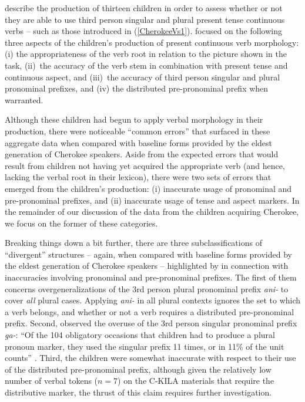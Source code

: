 \documentclass[output=paper,colorlinks,citecolor=brown,footheight=42pt]{langscibook}
\begin{document}
\citet{peter2008} describe the production of thirteen children in order to assess whether or not they are able to use third person singular and plural present tense continuous verbs -- such as those introduced in (\ref{CherokeeVs1}). \citet[175]{peter2008} focused on the following three aspects of the children's production of present continuous verb morphology: (i) the appropriateness of the verb root in relation to the picture shown in the task, (ii)~the accuracy of the verb stem in combination with present tense and continuous aspect, and (iii)~the accuracy of third person singular and plural pronominal prefixes, and (iv) the distributed pre-pronominal prefix when warranted. 

Although these children had begun to apply verbal morphology in their production, there were noticeable “common errors” that surfaced in these aggregate data when compared with baseline forms provided by the eldest generation of Cherokee speakers. Aside from the expected errors that would result from children not having yet acquired the appropriate verb (and hence, lacking the verbal root in their lexicon), there were two sets of errors that emerged from the children's production: (i) inaccurate usage of pronominal and pre-pronominal prefixes, and (ii) inaccurate usage of tense and aspect markers. In the remainder of our discussion of the data from the children acquiring Cherokee, we focus on the former of these categories. 

Breaking things down a bit further, there are three subclassifications of “divergent” structures -- again, when compared with baseline forms provided by the eldest generation of Cherokee speakers -- highlighted by \citet{peter2008} in connection with inaccuracies involving pronominal and pre-pronominal prefixes. The first of them concerns overgeneralizations of the 3rd person plural pronominal prefix \textit{ani-} to cover \textit{all} plural cases. Applying \textit{ani-} in all plural contexts ignores the set to which a verb belongs, and whether or not a verb requires a distributed pre-pronominal prefix. Second, \citet{peter2008} observed the overuse of the 3rd person singular pronominal prefix \textit{ga-}: “Of the 104 obligatory occasions that children had to produce a plural pronoun marker, they used the singular prefix 11 times, or in 11\% of the unit counts” \citep[178]{peter2008}. Third, the children were somewhat inaccurate with respect to their use of the distributed pre-pronominal prefix, although given the relatively low number of verbal tokens ($n=7$) on the C-KILA materials that require the distributive marker, the thrust of this claim requires further investigation.
\end{document}
